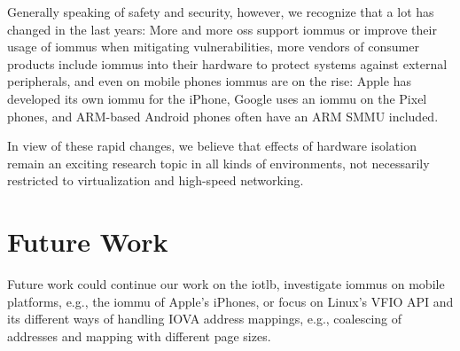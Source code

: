 Generally speaking of safety and security, however, we recognize that a lot has
changed in the last years: More and more \acp{os} support \acp{iommu} or improve
their usage of \acp{iommu} when mitigating vulnerabilities, more vendors of
consumer products include \acp{iommu} into their hardware to protect systems
against external peripherals, and even on mobile phones \acp{iommu} are on the
rise: Apple has developed its own \ac{iommu} for the iPhone, Google uses an
\ac{iommu} on the Pixel phones, and ARM-based Android phones often have an ARM
SMMU included.

In view of these rapid changes, we believe that effects of hardware isolation
remain an exciting research topic in all kinds of environments, not necessarily
restricted to virtualization and high-speed networking.


\section{Future Work}
\label{chap:future_work}

Future work could continue our work on the \ac{iotlb}, investigate \acp{iommu}
on mobile platforms, e.g., the \ac{iommu} of Apple's iPhones, or focus on
Linux's VFIO API and its different ways of handling IOVA address mappings, e.g.,
coalescing of addresses and mapping with different page sizes.

